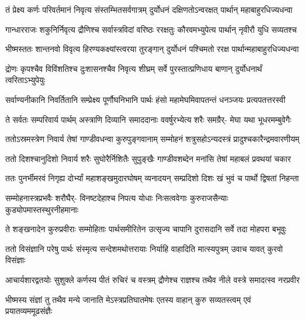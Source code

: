 \fourlineindentedshloka
{तं प्रेक्ष्य कर्णः परिवर्तमानं}
{निवृत्य संस्तम्भितसर्वगात्रम्}
{दुर्योधनं दक्षिणतोऽन्वरक्षत्}
{पार्थान् महाबाहुरधिज्यधन्वा}


\fourlineindentedshloka
{गान्धारराजः शकुनिर्निवृत्य}
{द्रौणिश्च सर्वास्त्रविदां वरिष्ठः}
{ररक्षतुः कौरवमभ्युपेत्य}
{पार्थान् नृवीरौ युधि सव्यतश्च}


\fourlineindentedshloka
{भीष्मस्ततः शान्तनवो विवृत्य}
{हिरण्यकक्ष्यांस्त्वरया तुरङ्गान्}
{दुर्योधनं पश्चिमतो ररक्ष}
{पार्थान्महाबाहुरधिज्यधन्वा}


\fourlineindentedshloka
{द्रोणः कृपश्चैव विविंशतिश्च}
{दुःशासनश्चैव निवृत्य शीघ्रम्}
{सर्वे पुरस्तात्प्रणिधाय बाणान्}
{दुर्योधनार्थं त्वरिताऽभ्युपेयुः}


\fourlineindentedshloka
{सर्वाण्यनीकानि निवर्तितानि}
{सम्प्रेक्ष्य पूर्णौघनिभानि पार्थः}
{हंसो महामेघमिवापतन्तं}
{धनञ्जयः प्रत्यपतत्तरस्वी}


\fourlineindentedshloka
{ते सर्वतः सम्परिवार्य पार्थम्}
{अस्त्राणि दिव्यानि समाददानाः}
{ववर्षुरभ्येत्य शरैः समग्रैर्-}
{मेघा यथा भूधरमम्बुवेगैः}


\fourlineindentedshloka
{ततोऽस्रमस्त्रेण निवार्य तेषां}
{गाण्डीवधन्वा कुरुपुङ्गवानाम्}
{सम्मोहनं शत्रुसहोऽन्यदस्त्रं}
{प्रादुश्चकारैन्द्रमवारणीयम्}


\fourlineindentedshloka
{ततो दिशश्चानुदिशो निवार्य}
{शरैः सुघोरैर्निशितैः सुपुङ्खैः}
{गाण्डीवशब्देन मनांसि तेषां}
{महाबलं प्रवथयां चकार}


\fourlineindentedshloka
{ततः पुनर्भीमरवं निगृह्य}
{दोर्भ्यां महाशङ्खमुदारघोषम्}
{व्यनादयन् सम्प्रदिशो दिशः खं}
{भुवं च पार्थो द्विषतां निहन्ता}


\fourlineindentedshloka
{सम्मोहनास्त्रप्रभवैः शरौघैर्-}
{विनष्टदेहाश्च निपत्य योधाः}
{निःसत्ववेगाः कुरुराजसैन्याः}
{कुड्योपमास्तस्थुरनीहमानाः}


\fourlineindentedshloka
{ते शङ्खनादेन कुरुप्रवीराः}
{सम्मोहिताः पार्थसमीरितेन}
{उत्सृज्य चापानि दुरासदानि}
{सर्वे तदा मोहपरा बभूवुः}


\fourlineindentedshloka
{ततो विसंज्ञानि परेषु पार्थः}
{संस्मृत्य सन्देशमथोत्तरायाः}
{निर्याहि वाहादिति मात्स्यपुत्रम्}
{उवाच यावत् कुरवो विसंज्ञाः}


\fourlineindentedshloka
{आचार्यशारद्वतयोः सुशुक्ले}
{कर्णस्य पीतं रुचिरं च वस्त्रम्}
{द्रौणेश्च राज्ञश्च तथैव नीले}
{वस्त्रे समादत्स्व नरप्रवीर}


\fourlineindentedshloka
{भीष्मस्य संज्ञां तु तथैव मन्ये}
{जानाति मेऽस्त्रप्रतिघातमेषः}
{एतस्य वाहान् कुरु सव्यतस्त्वम्}
{एवं प्रयातव्यममूढसंज्ञैः}



